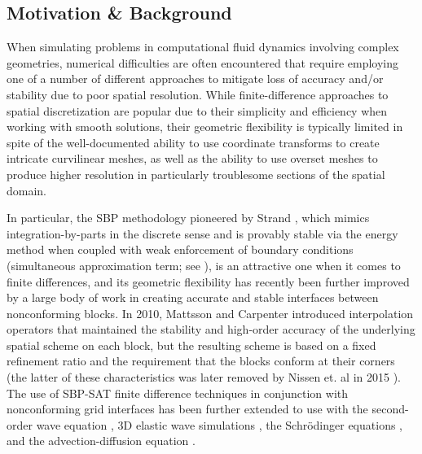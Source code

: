 \subsection{Motivation \& Background} \label{sec:hybrid_goals}


When simulating problems in computational fluid dynamics involving complex
geometries, numerical difficulties are often encountered that require
employing one of a number of different approaches to mitigate loss of accuracy and/or stability
due to poor spatial resolution. While finite-difference approaches to spatial
discretization are popular due to their simplicity and efficiency when working
with smooth solutions, their geometric flexibility is typically limited in spite
of the well-documented ability to use coordinate transforms to create intricate
curvilinear meshes, as well as the ability to use overset meshes to produce
higher resolution in particularly troublesome sections of the spatial domain.

In particular, the SBP methodology pioneered by Strand \cite{strand1994summation},
which mimics
integration-by-parts in the discrete sense and is provably stable via the energy method when coupled with weak enforcement of boundary conditions (simultaneous approximation term; see \cite{svard2007stable}),
is an attractive one when it comes to finite differences, and its geometric
flexibility has recently been further improved by a large body of work in creating
accurate and stable interfaces between nonconforming blocks. In 2010, Mattsson and
Carpenter \cite{mattsson2010stable} introduced interpolation operators that maintained
the stability and high-order accuracy of the underlying spatial scheme on each block,
but the resulting scheme is based on a fixed refinement ratio and the requirement that
the blocks conform at their corners (the latter of these characteristics was
later removed by Nissen et. al in 2015 \cite{nissen2015stable}). The use of SBP-SAT finite
difference techniques in conjunction with nonconforming grid interfaces has been further
extended to use with the second-order wave equation \cite{wang2016high}, 3D elastic wave
simulations \cite{gao2020energy}, the Schr{\"o}dinger equations \cite{nissen2012stability}, and the advection-diffusion equation \cite{lundquist2018hybrid}. 


